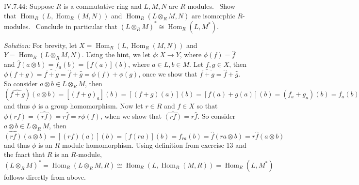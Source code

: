 \documentclass{letter}
\newcommand{\tmem}[1]{{\em #1\/}}
\newcommand{\tmop}[1]{\ensuremath{\operatorname{#1}}}
\begin{document}
IV.7.44: Suppose $R$ is a commutative ring and $L, M, N$ are $R$-modules. \
Show that $\tmop{Hom}_R (L, \tmop{Hom}_R (M, N))$ and $\tmop{Hom}_R (L
\otimes_R M, N)$ are isomorphic $R$-modules. \ Conclude in particular that $(L
\otimes_R M)^{\ast} \cong \tmop{Hom}_R (L, M^{\ast})$.

{\tmem{Solution:}} For brevity, let $X = \text{$\tmop{Hom}_R (L, \tmop{Hom}_R
(M, N))$}$ and $Y = \text{$\tmop{Hom}_R (L \otimes_R M, N)$}$. Using the hint,
we let $\phi : X \rightarrow Y$, where $\phi (f) = \hat{f}$ and $\hat{f} (a
\otimes b) = f_a (b) = [f (a)] (b)$, where $a \in L, b \in M$. Let $f, g \in
X$, then $\phi (f + g) = \widehat{f + g} = \hat{f} + \hat{g} = \phi (f) + \phi
(g)$, once we show that $\widehat{f + g} = \hat{f} + \hat{g}$. So consider $a
\otimes b \in L \otimes_R M$, then $( \widehat{f + g}) (a \otimes b) = [(f +
g)_a] (b) = [(f + g) (a)] (b) = [f (a) + g (a)] (b) = (f_a + g_a) (b) = f_a
(b) + g_a (b) = \hat{f} (a \otimes b) + \hat{g} (a \otimes b)$ and thus $\phi$
is a group homomorphism. Now let $r \in R$ and $f \in X$ so that $\phi (r f) =
\widehat{(r f)} = r \hat{f} = r \phi (f)$, when we show that $\widehat{(r f)}
= r \hat{f}$. So consider $a \otimes b \in L \otimes_R M$, then $\widehat{(r
f)} (a \otimes b) = [(r f) (a)] (b) = [f (r a)] (b) = f_{r a} (b) = \hat{f} (r
a \otimes b) = r \hat{f} (a \otimes b)$ and thus $\phi$ is an $R$-module
homomorphism. Using definition from exercise 13 and the faact that $R$ is an
$R$-module, $(L \otimes_R M)^{\ast} = \tmop{Hom}_R (L \otimes_R M, R) \cong
\tmop{Hom}_R (L, \tmop{Hom}_R (M, R)) = \text{$\tmop{Hom}_R (L, M^{\ast})$}$
follows directly from above.
\end{document}
